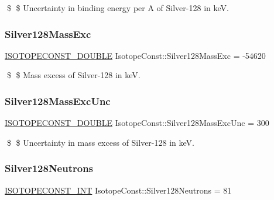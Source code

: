 \$ \$ Uncertainty in binding energy per A of Silver-\/128 in keV. \mbox{\label{group___isotope_const-_silver-_ag128_gab986c7a4f4b157992abfdf2412de0463}} 
\subsubsection{\texorpdfstring{Silver128\+Mass\+Exc}{Silver128MassExc}}
{\footnotesize\ttfamily \mbox{\hyperlink{group___isotope_const-_macros_ga8f45a7272ce02c0b4c65c44636ed719a}{I\+S\+O\+T\+O\+P\+E\+C\+O\+N\+S\+T\+\_\+\+D\+O\+U\+B\+LE}} Isotope\+Const\+::\+Silver128\+Mass\+Exc = -\/54620}

\$ \$ Mass excess of Silver-\/128 in keV. \mbox{\label{group___isotope_const-_silver-_ag128_gaf36822e2fb1063f099ab3ca29d08f027}} 
\subsubsection{\texorpdfstring{Silver128\+Mass\+Exc\+Unc}{Silver128MassExcUnc}}
{\footnotesize\ttfamily \mbox{\hyperlink{group___isotope_const-_macros_ga8f45a7272ce02c0b4c65c44636ed719a}{I\+S\+O\+T\+O\+P\+E\+C\+O\+N\+S\+T\+\_\+\+D\+O\+U\+B\+LE}} Isotope\+Const\+::\+Silver128\+Mass\+Exc\+Unc = 300}

\$ \$ Uncertainty in mass excess of Silver-\/128 in keV. \mbox{\label{group___isotope_const-_silver-_ag128_gac7ff9ce9c0aa20c74b5ccfa4e6c0e668}} 
\subsubsection{\texorpdfstring{Silver128\+Neutrons}{Silver128Neutrons}}
{\footnotesize\ttfamily \mbox{\hyperlink{group___isotope_const-_macros_ga5f18360b3e99483a35c32d789e62621c}{I\+S\+O\+T\+O\+P\+E\+C\+O\+N\+S\+T\+\_\+\+I\+NT}} Isotope\+Const\+::\+Silver128\+Neutrons = 81}

